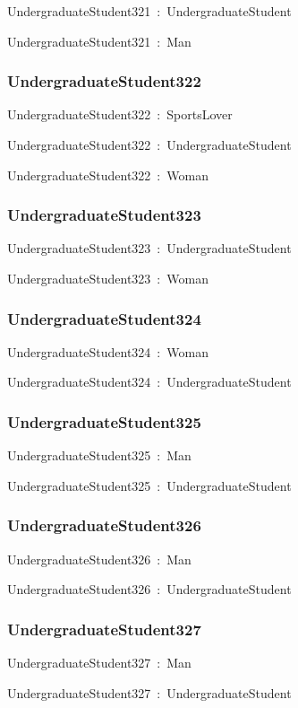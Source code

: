 \documentclass{article}
\begin{document}
UndergraduateStudent321~:~UndergraduateStudent

UndergraduateStudent321~:~Man

\subsubsection*{UndergraduateStudent322}

UndergraduateStudent322~:~SportsLover

UndergraduateStudent322~:~UndergraduateStudent

UndergraduateStudent322~:~Woman

\subsubsection*{UndergraduateStudent323}

UndergraduateStudent323~:~UndergraduateStudent

UndergraduateStudent323~:~Woman

\subsubsection*{UndergraduateStudent324}

UndergraduateStudent324~:~Woman

UndergraduateStudent324~:~UndergraduateStudent

\subsubsection*{UndergraduateStudent325}

UndergraduateStudent325~:~Man

UndergraduateStudent325~:~UndergraduateStudent

\subsubsection*{UndergraduateStudent326}

UndergraduateStudent326~:~Man

UndergraduateStudent326~:~UndergraduateStudent

\subsubsection*{UndergraduateStudent327}

UndergraduateStudent327~:~Man

UndergraduateStudent327~:~UndergraduateStudent
\end{document}
